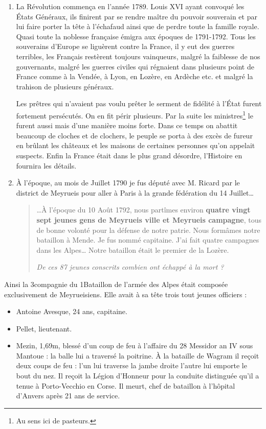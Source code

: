 {{\begin{enumerate}[label=\arabic*., leftmargin=2.0em, itemsep=0.55em, topsep=0.25em]
\item
La Révolution commença en l’année 1789. Louis XVI ayant convoqué les États Généraux, ils finirent
par se rendre maître du pouvoir souverain et par lui faire porter la tête à l’échafaud ainsi que de
perdre toute la famille royale. Quasi toute la noblesse française émigra aux époques de 1791-1792.
Tous les souverains d’Europe se liguèrent contre la France, il y eut des guerres terribles, les Français
restèrent toujours vainqueurs, malgré la faiblesse de nos gouvernants, malgré les guerres civiles qui régnaient
dans plusieurs point de France comme à la Vendée, à Lyon, en Lozère, en Ardèche etc. et malgré la trahison de
plusieurs généraux.

Les prêtres qui n’avaient pas voulu prêter le serment de fidélité à l’État furent fortement persécutés. On en fit
périr plusieurs. Par la suite les ministres\footnote{Au sens ici de pasteurs.} le furent aussi mais d’une manière moins forte.
Dans ce temps on abattit beaucoup de cloches et de clochers, le peuple se porta à des excès de fureur en brûlant
les châteaux et les maisons de certaines personnes qu’on appelait suspects. Enfin la France était dans le plus
grand désordre, l’Histoire en fournira les détails.

\item
À l’époque, au mois de Juillet 1790 je fus député avec M. Ricard par le district de Meyrueis pour aller à Paris à la grande fédération du 14 Juillet…

\begin{quote}
…À l’époque du 10 Août 1792, nous partîmes environ \textbf{quatre vingt sept jeunes gens de Meyrueis ville et
Meyrueis campagne}, tous de bonne volonté pour la défense de notre patrie. Nous formâmes notre bataillon à
Mende. Je fus nommé capitaine. J’ai fait quatre campagnes dans les Alpes… Notre bataillon était le premier de
la Lozère.

\textit{De ces 87 jeunes conscrits combien ont échappé à la mort ?}
\end{quote}
\end{enumerate}


Ainsi la 3\ieme compagnie du 1\ier Bataillon de l’armée des Alpes était composée
exclusivement de Meyrueisiens. Elle avait à sa tête trois tout jeunes officiers :

\begin{itemize}[leftmargin=1.8em, itemsep=0em, topsep=0.2em]
\item Antoine Avesque, 24 ans, capitaine.
\item Pellet, lieutenant.
\item Mezin, 1,69m, blessé d’un coup de feu à l’affaire du 28 Messidor an IV sous Mantoue :
la balle lui a traversé la poitrine. À la bataille de Wagram il reçoit deux coups de feu :
l’un lui traverse la jambe droite l’autre lui emporte le bout du nez. Il reçoit la Légion
d’Honneur pour la conduite distinguée qu’il a tenue à Porto-Vecchio en Corse. Il
meurt, chef de bataillon à l’hôpital d’Anvers après 21 ans de service.
\end{itemize}

}}
